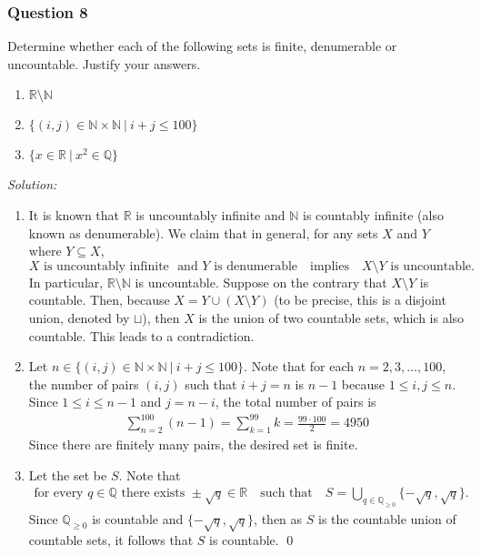 \documentclass[12pt]{article}
\begin{document}
\subsubsection*{Question 8}
Determine whether each of the following sets is finite, denumerable or uncountable. Justify your answers.
\begin{enumerate}[label=\textbf{(\roman*)}]
\itemsep 0em
    \item $\mathbb{R}\setminus \mathbb{N}$
    \item $\{(i,j)\in\mathbb{N}\times\mathbb{N}\ |\ i+j\leq 100\}$
    \item $\{x\in\mathbb{R}\ |\ x^2\in\mathbb{Q}\}$
\end{enumerate}
\emph{Solution:}
\begin{enumerate}[label=\textbf{(\roman*)}]
    \itemsep 0em
    \item It is known that $\mathbb{R}$ is uncountably infinite and $\mathbb{N}$ is countably infinite (also known as denumerable). We claim that in general, for any sets $X$ and $Y$ where $Y\subseteq X$, \[X\text{ is uncountably infinite }\text{ and }Y\text{ is denumerable}\quad\text{implies}\quad  X\setminus Y\text{ is uncountable}.\] In particular, $\mathbb{R}\setminus\mathbb{N}$ is uncountable. Suppose on the contrary that $X\setminus Y$ is countable. Then, because $X=Y\cup \left(X\setminus Y\right)$ (to be precise, this is a disjoint union, denoted by $\sqcup$), then $X$ is the union of two countable sets, which is also countable. This leads to a contradiction.
    \item Let $n\in \{(i,j)\in\mathbb{N}\times\mathbb{N}\ |\ i+j\leq 100\}$. Note that for each $n=2,3,\ldots,100$, the number of pairs $(i,j)$ such that $i+j=n$ is $n-1$ because $1\le i,j\le n$. Since $1\le i \le n-1$ and $j=n-i$, the total number of pairs is
\begin{align*}
    \sum_{n=2}^{100}(n-1)=\sum_{k=1}^{99}k=\frac{99\cdot 100}{2}=4950
\end{align*}
Since there are finitely many pairs, the desired set is finite.
\item Let the set be $S$. Note that
\begin{align*}
    \text{for every }q\in \mathbb{Q}\text{ there exists } \pm\sqrt{q}\in\mathbb{R}\quad\text{such that}\quad S=\bigcup_{q\in\mathbb{Q}_{\geq 0}}\{-\sqrt{q},\sqrt{q}\}.
\end{align*}
Since $\mathbb{Q}_{\geq 0}$ is countable and $\{-\sqrt{q},\sqrt{q}\}$, then as $S$ is the countable union of countable sets, it follows that $S$ is countable. \qed 
\end{enumerate}
\end{document}
